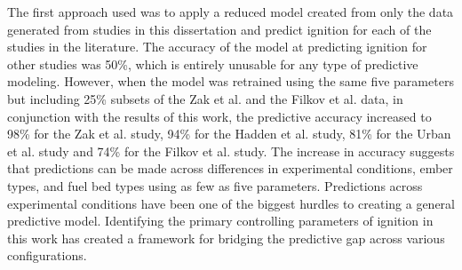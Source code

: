     The first approach used was to apply a reduced model created from only the data generated from studies in this dissertation and predict ignition for each of the studies in the literature. The accuracy of the model at predicting ignition for other studies was 50\%, which is entirely unusable for any type of predictive modeling. However, when the model was retrained using the same five parameters but including 25\% subsets of the Zak et al. and the Filkov et al. data, in conjunction with the results of this work, the predictive accuracy increased to 98\% for the Zak et al. study, 94\% for the Hadden et al. study, 81\% for the Urban et al. study and 74\% for the Filkov et al. study. The increase in accuracy suggests that predictions can be made across differences in experimental conditions, ember types, and fuel bed types using as few as five parameters. Predictions across experimental conditions have been one of the biggest hurdles to creating a general predictive model. Identifying the primary controlling parameters of ignition in this work has created a framework for bridging the predictive gap across various configurations.  